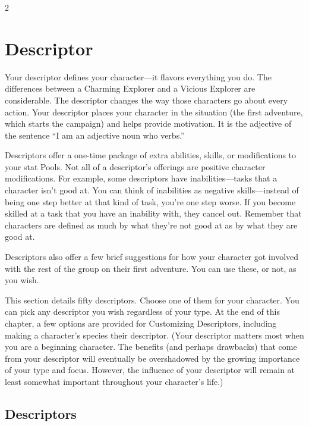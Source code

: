 \begin{multicols}{2}

\chapter{Descriptor}

Your descriptor defines your character—it flavors everything you do. The differences between a Charming Explorer and a Vicious Explorer are considerable. The descriptor changes the way those characters go about every action. Your descriptor places your character in the situation (the first adventure, which starts the campaign) and helps provide motivation. It is the adjective of the sentence “I am an adjective noun who verbs.”

Descriptors offer a one-time package of extra abilities, skills, or modifications to your stat Pools. Not all of a descriptor’s offerings are positive character modifications. For example, some descriptors have inabilities—tasks that a character isn’t good at. You can think of inabilities as negative skills—instead of being one step better at that kind of task, you’re one step worse. If you become skilled at a task that you have an inability with, they cancel out. Remember that characters are defined as much by what they’re not good at as by what they are good at.

Descriptors also offer a few brief suggestions for how your character got involved with the rest of the group on their first adventure. You can use these, or not, as you wish.

This section details fifty descriptors. Choose one of them for your character. You can pick any descriptor you wish regardless of your type. At the end of this chapter, a few options are provided for Customizing Descriptors, including making a character’s species their descriptor.
(Your descriptor matters most when you are a beginning character. The benefits (and perhaps drawbacks) that come from your descriptor will eventually be overshadowed by the growing importance of your type and focus. However, the influence of your descriptor will remain at least somewhat important throughout your character’s life.)

\section{Descriptors}


\end{multicols}
